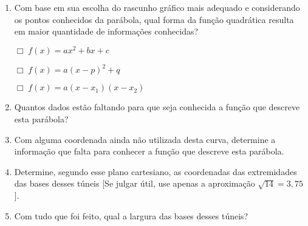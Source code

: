 \documentclass[10 pt,usenames,dvipsnames, oneside]{article}
\begin{document}
\begin{enumerate}
\item {} 
Com base em sua escolha do rascunho gráfico mais adequado e considerando os pontos conhecidos da parábola, qual forma da função quadrática resulta em maior quantidade de informações conhecidas?

\(\Box \; f(x)=ax^2+bx+c\)

\(\Box \; f(x)=a(x-p)^2+q\)

\(\Box \; f(x)=a(x-x_1)(x-x_2)\)

\item {} 
Quantos dados estão faltando para que seja conhecida a função que descreve esta parábola?

\item {} 
Com alguma coordenada ainda não utilizada desta curva, determine a informação que falta para conhecer a função que descreve esta parábola.

\item {} 
Determine, segundo esse plano cartesiano, as coordenadas das extremidades das bases desses túneis {[}Se julgar útil, use apenas a aproximação \(\sqrt{14}=3,75\){]}.

\item {} 
Com tudo que foi feito, qual a largura das bases desses túneis?

\end{enumerate}
\end{document}
